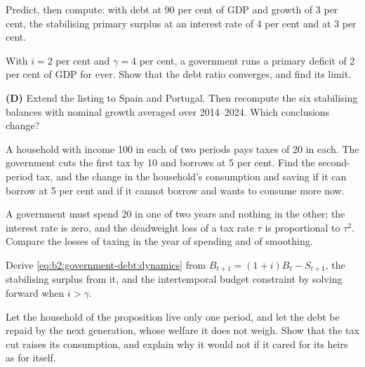 \begin{exercise}[$\star\star$]\label{exo:b2:government-debt:5}
Predict, then compute: with debt at 90 per cent of GDP and growth of 3 per cent, the stabilising primary surplus at an interest rate of 4 per cent and at 3 per cent.
\end{exercise}

\begin{exercise}[$\star\star$]\label{exo:b2:government-debt:6}
With $i = 2$ per cent and $\gamma = 4$ per cent, a government runs a primary deficit of 2 per cent of GDP for ever. Show that the debt ratio converges, and find its limit.
\end{exercise}

\begin{exercise}[$\star\star$]\label{exo:b2:government-debt:7}
\textbf{(D)} Extend the listing to Spain and Portugal. Then recompute the six stabilising balances with nominal growth
averaged over 2014--2024. Which conclusions change?
\end{exercise}

\begin{exercise}[$\star\star$]\label{exo:b2:government-debt:8}
A household with income 100 in each of two periods pays taxes of 20 in each. The government cuts the first tax by 10 and
borrows at 5 per cent. Find the second-period tax, and the change in the household's consumption and saving if it can
borrow at 5 per cent and if it cannot borrow and wants to consume more now.
\end{exercise}

\begin{exercise}[$\star\star$]\label{exo:b2:government-debt:9}
A government must spend 20 in one of two years and nothing in the other; the interest rate is zero, and the deadweight
loss of a tax rate $\tau$ is proportional to $\tau^2$. Compare the losses of taxing in the year of spending and of smoothing.
\end{exercise}

\begin{exercise}[$\star\star\star$]\label{exo:b2:government-debt:10}
Derive \eqref{eq:b2:government-debt:dynamics} from $B_{t+1} = (1 + i)B_t - S_{t+1}$, the stabilising surplus from it, and the intertemporal budget constraint by solving forward when
$i > \gamma$.
\end{exercise}

\begin{exercise}[$\star\star\star$]\label{exo:b2:government-debt:11}
Let the household of the proposition live only one period, and let the debt be repaid by the next generation, whose
welfare it does not weigh. Show that the tax cut raises its consumption, and explain why it would not if it cared for its
heirs as for itself.
\end{exercise}

